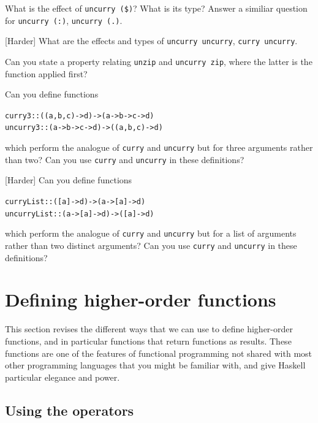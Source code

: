 \begin{exercises}

\item
What is the effect of \texttt{uncurry (\$)}? What is its type? Answer a similiar question for \texttt{uncurry (:)}, \texttt{uncurry (.)}.

\item {[Harder]} What are the effects and types of \texttt{uncurry uncurry}, \texttt{curry uncurry}.

\item
Can you state a property relating \texttt{unzip} and \texttt{uncurry zip}, where the latter is the function applied first?

\item
Can you define functions 
\begin{alltt}
curry3 :: ((a,b,c) -> d) -> (a -> b -> c -> d)
uncurry3 :: (a -> b -> c -> d) -> ((a,b,c) -> d)
\end{alltt}
which perform the analogue of \texttt{curry} and \texttt{uncurry} but for three arguments rather than two? Can you use \texttt{curry} and \texttt{uncurry} in these definitions?

\item {[Harder]}
Can you define functions 
\begin{alltt}
curryList :: ([a] -> d) -> (a -> [a] -> d)
uncurryList :: (a -> [a] -> d) -> ([a] -> d)
\end{alltt}
which perform the analogue of \texttt{curry} and \texttt{uncurry} but for a list of  arguments rather than two distinct arguments? Can you use \texttt{curry} and \texttt{uncurry} in these definitions?

\end{exercises}



\section{Defining higher-order functions}
\label{defHOFs}

This section revises the different ways that we can use to define higher-order functions, and in particular functions that return functions as results. These functions are one of the features of functional programming not shared with most other programming languages that you might be familiar with, and give Haskell particular elegance and power.

\subsection*{Using the operators}

